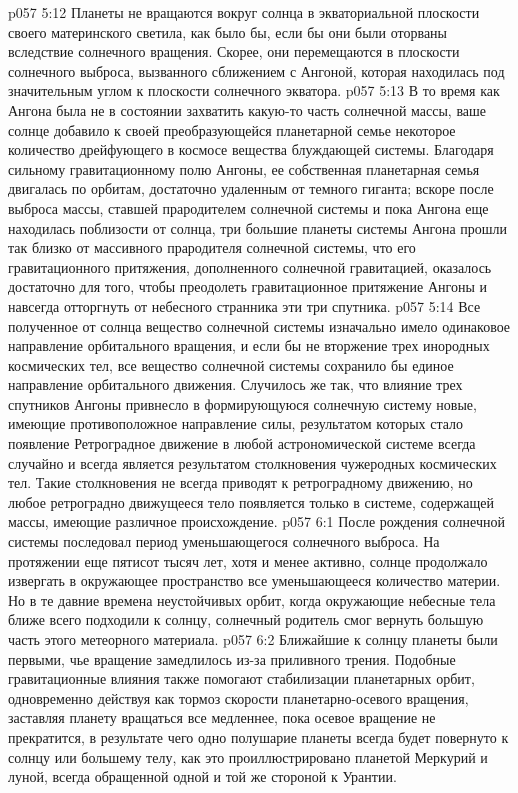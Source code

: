 \vs p057 5:12 Планеты не вращаются вокруг солнца в экваториальной плоскости своего материнского светила, как было бы, если бы они были оторваны вследствие солнечного вращения. Скорее, они перемещаются в плоскости солнечного выброса, вызванного сближением с Ангоной, которая находилась под значительным углом к плоскости солнечного экватора.
\vs p057 5:13 \pc В то время как Ангона была не в состоянии захватить какую\hyp{}то часть солнечной массы, ваше солнце добавило к своей преобразующейся планетарной семье некоторое количество дрейфующего в космосе вещества блуждающей системы. Благодаря сильному гравитационному полю Ангоны, ее собственная планетарная семья двигалась по орбитам, достаточно удаленным от темного гиганта; вскоре после выброса массы, ставшей прародителем солнечной системы и пока Ангона еще находилась поблизости от солнца, три большие планеты системы Ангона прошли так близко от массивного прародителя солнечной системы, что его гравитационного притяжения, дополненного солнечной гравитацией, оказалось достаточно для того, чтобы преодолеть гравитационное притяжение Ангоны и навсегда отторгнуть от небесного странника эти три спутника.
\vs p057 5:14 Все полученное от солнца вещество солнечной системы изначально имело одинаковое направление орбитального вращения, и если бы не вторжение трех инородных космических тел, все вещество солнечной системы сохранило бы единое направление орбитального движения. Случилось же так, что влияние трех спутников Ангоны привнесло в формирующуюся солнечную систему новые, имеющие противоположное направление силы, результатом которых стало появление  Ретроградное движение в любой астрономической системе всегда случайно и всегда является результатом столкновения чужеродных космических тел. Такие столкновения не всегда приводят к ретроградному движению, но любое ретроградно движущееся тело появляется только в системе, содержащей массы, имеющие различное происхождение.
\vs p057 6:1 После рождения солнечной системы последовал период уменьшающегося солнечного выброса. На протяжении еще пятисот тысяч лет, хотя и менее активно, солнце продолжало извергать в окружающее пространство все уменьшающееся количество материи. Но в те давние времена неустойчивых орбит, когда окружающие небесные тела ближе всего подходили к солнцу, солнечный родитель смог вернуть большую часть этого метеорного материала.
\vs p057 6:2 \pc Ближайшие к солнцу планеты были первыми, чье вращение замедлилось из\hyp{}за приливного трения. Подобные гравитационные влияния также помогают стабилизации планетарных орбит, одновременно действуя как тормоз скорости планетарно\hyp{}осевого вращения, заставляя планету вращаться все медленнее, пока осевое вращение не прекратится, в результате чего одно полушарие планеты всегда будет повернуто к солнцу или большему телу, как это проиллюстрировано планетой Меркурий и луной, всегда обращенной одной и той же стороной к Урантии.

